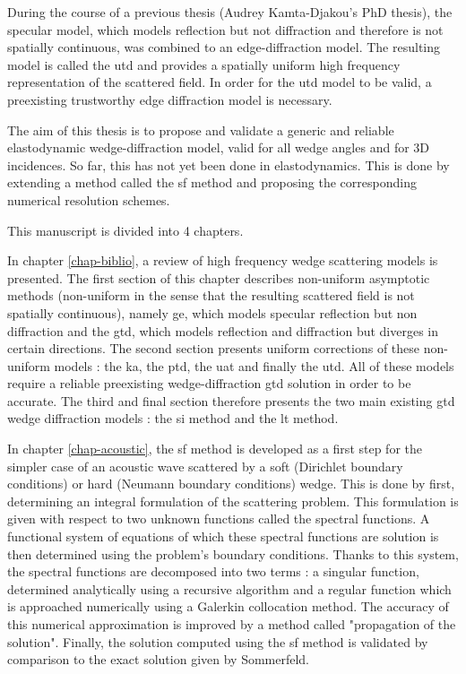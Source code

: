 During the course of a previous thesis (Audrey Kamta-Djakou's PhD thesis), the specular model, which models reflection but not diffraction and therefore is not spatially continuous, was combined to an edge-diffraction model. The resulting model is called the \acrfull{utd} and provides a spatially uniform high frequency representation of the scattered field. In order for the \acrshort{utd} model to be valid, a preexisting trustworthy edge diffraction model is necessary.

The aim of this thesis is to propose and validate a generic and reliable elastodynamic wedge-diffraction model, valid for all wedge angles and for 3D incidences. So far, this has not yet been done in elastodynamics. This is done by extending a method called the \acrfull{sf} method and proposing the corresponding numerical resolution schemes. 

This manuscript is divided into 4 chapters.

In chapter \ref{chap-biblio}, a review of high frequency wedge scattering models is presented. The first section of this chapter describes non-uniform asymptotic methods (non-uniform in the sense that the resulting scattered field is not spatially continuous), namely \acrfull{ge}, which models specular reflection but non diffraction and the \acrfull{gtd}, which models reflection and diffraction but diverges in certain directions. The second section presents uniform corrections of these non-uniform models : the \acrfull{ka}, the \acrfull{ptd}, the \acrfull{uat} and finally the \acrfull{utd}. All of these models require a reliable preexisting wedge-diffraction \acrshort{gtd} solution in order to be accurate. The third and final section therefore presents the two main existing \acrshort{gtd} wedge diffraction models : the \acrfull{si} method and the \acrfull{lt} method.

In chapter \ref{chap-acoustic}, the \acrfull{sf} method is developed as a first step for the simpler case of an acoustic wave scattered by a soft (Dirichlet boundary conditions) or hard (Neumann boundary conditions) wedge. This is done by first, determining an integral formulation of the scattering problem. This formulation is given with respect to two unknown functions called the spectral functions. A functional system of equations of which these spectral functions are solution is then determined using the problem's boundary conditions. Thanks to this system, the spectral functions are decomposed into two terms : a singular function, determined analytically using a recursive algorithm and a regular function which is approached numerically using a Galerkin collocation method. The accuracy of this numerical approximation is improved by a method called "propagation of the solution". Finally, the solution computed using the \acrlong{sf} method is validated by comparison to the exact solution given by Sommerfeld.

